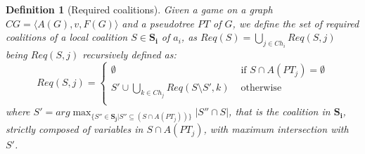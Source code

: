 \documentclass{aamas2012}
\newtheorem{definition}{Definition}
\begin{document}
\begin{definition}[Required coalitions]
Given a game on a graph $CG= \allowbreak \langle A(G), v, F(G) \rangle $ and a
pseudotree $PT$ of $G$, we define the set of \emph{required} coalitions of a
local coalition $S\in \mathbf{S_i}$ of $a_i$, as $Req(S) = \bigcup_{j\in
Ch_i} Req(S,j)$ being $Req(S,j)$ recursively defined as:
\begin{equation*}
 Req(S,j) =
 \begin{cases}
  \emptyset & \text{ if } S\cap A(PT_j) = \emptyset \\
  S' \cup \bigcup_{k\in Ch_j} Req(S\setminus S',k)& \text{ otherwise }
  \\
 \end{cases}
 \end{equation*}
 \noindent where $S' = arg \max_{\{S''\in \mathbf{S_j} \vert S'' \subseteq
 (S\cap A(PT_j))\}} \vert S''\cap S\vert$, that is the coalition in
 $\mathbf{S_i}$, strictly composed of variables in $S\cap A(PT_j)$, with maximum
 intersection with $S'$.
 \label{def:required_variables}
\end{definition}

\end{document}
